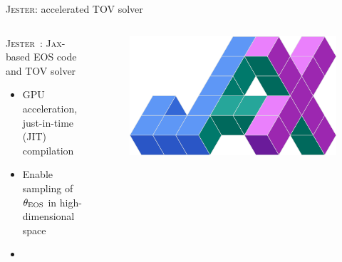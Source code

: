 \documentclass[usenames,dvipsnames,t]{beamer}
\begin{document}
\begin{frame}{\textsc{Jester}: accelerated TOV solver}
  \def\negx{-3mm}
  \def\x{4mm}
  \def\z{1mm}

  \vspace{\negx}

  \begin{columns}
    \begin{column}{0.80\textwidth}

      \textsc{Jester}~\cite{Wouters:2025zju}: \textsc{Jax}-based EOS code and TOV solver
      \begin{itemize}
        \item GPU acceleration, just-in-time (JIT) compilation

        \vspace{\z}

        \item Enable sampling of $\theta_{\rm{EOS}}$ in high-dimensional space

        \vspace{\z}

        \item {}

      \end{itemize}
    \end{column}

    \begin{column}{0.20\textwidth}
      \begin{figure}
        \centering
      \includegraphics[width=0.75\linewidth]{Figures/jax.png}
      \end{figure}
    \end{column}
  \end{columns}



\end{frame}
\end{document}
